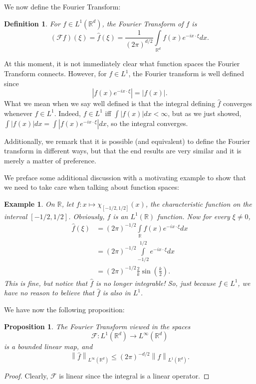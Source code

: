 \documentclass[letterpaper,twoside,12pt]{article}
\theoremstyle{mystyle}
\newtheorem{definition}{Definition}[section]
\newtheorem{prop}{Proposition}[section]
\newtheorem*{example}{Example}
\newcommand{\R}{{\mathbb R}}
\newcommand{\cg}{\color{gray}}
\newcommand{\cbk}{\color{black}}
\begin{document}
We now define the Fourier Transform: 
\begin{definition}
  For $f \in L^1\left( \R^d \right)$, the Fourier Transform of $f$ is 
  \[\left( \mathcal F f \right)\left( \xi \right) =\hat f \left( \xi  \right)= \frac{1}{\left( 2\pi  \right)^{d/2}} \int\limits_{\R^d } f(x) e^{-ix\cdot \xi} dx.\]
\end{definition}
At this moment, it is not immediately clear what function spaces the Fourier Transform connects. However, for $f \in L^1$, the Fourier transform is well defined since 
\[\left\vert f(x) e^{- ix\cdot \xi} \right\vert = |f(x)|.\]
\cg What we mean when we say well defined is that the integral defining $\hat f$ converges whenever $f \in L^1$. Indeed, $f \in L^1$ iff $\int |f(x)| dx < \infty$, but as we just showed, $\int |f(x) | dx = \int \left\vert f(x) e^{- ix\cdot \xi} \right\vert dx$, so the integral converges. \cbk 

Additionally, we remark that it is possible (and equivalent) to define the Fourier transform in different ways, but that the end results are very similar and it is merely a matter of preference. 

We preface some additional discussion with a motivating example to show that we need to take care when talking about function spaces:
\begin{example}
  On $\R$, let $f : x \mapsto \chi_{[-1/2, 1/2]}(x)$, the characteristic function on the interval $[-1/2, 1/2]$. Obviously, $f$ is an $L^1\left( \R \right)$ function. Now for every $\xi\neq 0$, 
  \begin{align*}
    \hat f (\xi) &= \left( 2\pi \right)^{-1/2} \int\limits_\R f(x) e^{-ix\cdot \xi} dx \\
    &= \left( 2\pi \right)^{-1/2} \int\limits_{-1/2}^{1/2} e^{-ix\cdot \xi} dx \\
    &=\left( 2\pi \right)^{-1/2} \frac{2}{k}\sin\left( \frac{k}{2} \right).
  \end{align*}
  This is fine, but notice that $\hat f$ is no longer integrable! So, just because $f \in L^1$, we have no reason to believe that $\hat f$ is also in $L^1$. 
\end{example}
We have now the following proposition: 
\begin{prop}
  The Fourier Transform viewed in the spaces
  \[\mathcal F : L^1\left( \R^d \right) \to L^\infty \left( \R^d \right)\]
  is a bounded linear map, and 
  \[\left\| \hat f \right\|_{L^\infty \left( \R^d \right)} \leq \left( 2\pi \right)^{-d/2} \left\| f \right\|_{L^1\left( \R^d \right)}. \]
\end{prop}
\begin{proof}
  Clearly, $\mathcal F$ is linear since the integral is a linear operator. 
\end{proof}
\end{document}
